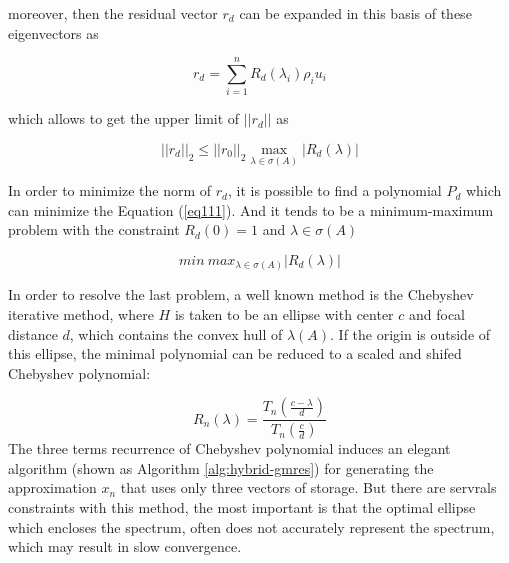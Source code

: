 moreover, then the residual vector \(r_d\) can be expanded in this basis of these eigenvectors as

\begin{equation}
\label{rn}
r_d=\sum_{i=1}^{n}R_d(\lambda_i)\rho_i u_i
\end{equation}

which allows to get the upper limit of $||r_d||$ as 

\begin{equation}
\label{eq111}
||r_d||_2 \leq ||r_0||_2 \max_{\lambda \in \sigma(A)}|R_d(\lambda)|
\end{equation}

In order to minimize the norm of \(r_d\), it is possible to find a polynomial $P_d$ which can minimize the Equation (\ref{eq111}). And it tends to be a minimum-maximum problem with the constraint \(R_d(0)=1\) and \(\lambda \in  \sigma(A)\)

\begin{equation}
min\ max_{\lambda \in \sigma (A)}|R_d(\lambda)|
\end{equation}

In order to resolve the last problem, a well known method is the Chebyshev iterative method, where \(H\) is taken to be an ellipse with center \(c\) and focal distance \(d\), which contains the convex hull of \(\lambda(A)\). If the origin is outside of this ellipse, the minimal polynomial can be reduced to a scaled and shifed Chebyshev polynomial:

\begin{equation}
R_n(\lambda)=\frac{T_n(\frac{c-\lambda}{d})}{ T_n (\frac{c}{d})}
\end{equation}
The three terms recurrence of Chebyshev polynomial induces an elegant algorithm (shown as Algorithm \ref{alg:hybrid-gmres}) for generating the approximation \(x_n\) that uses only three vectors of storage. But there are servrals constraints with this method, the most important is that the optimal ellipse which encloses the spectrum, often does not accurately represent the spectrum, which may result in slow convergence.

